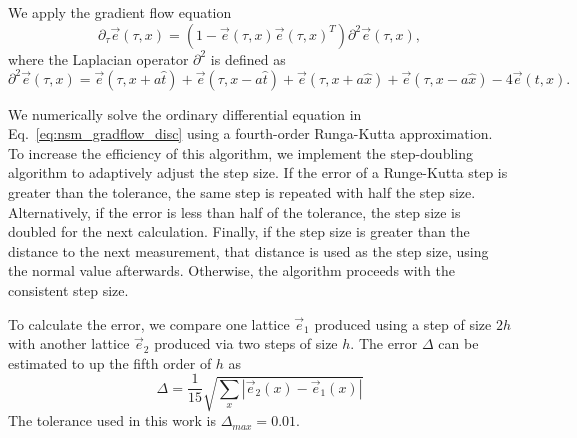 \documentclass[a4paper,11pt]{article}
\newcommand{\e}{\vec e}
\begin{document}
We apply the gradient flow equation
\begin{equation}
    \label{eq:nsm_gradflow_disc}
    \partial_\tau \e (\tau, x) = \left( 1 - \e(\tau,x) \e(\tau,x)^T\right) \partial^2 \e(\tau,x),
\end{equation}
where the Laplacian operator $\partial^2$ is defined as
\begin{equation*}
    \partial^2 \e(\tau,x) = \e(\tau, x+a \hat{t}) + \e(\tau,x-a\hat t) + \e(\tau, x+a \hat{x}) + \e(\tau,x-a\hat x) - 4 \e(t,x).
\end{equation*}

We numerically solve the ordinary differential equation in Eq.~\ref{eq:nsm_gradflow_disc} using a fourth-order Runga-Kutta approximation. To increase the efficiency of this algorithm, we implement the step-doubling algorithm to adaptively adjust the step size. If the error of a Runge-Kutta step is greater than the tolerance, the same step is repeated with half the step size. Alternatively, if the error is less than half of the tolerance, the step size is doubled for the next calculation. Finally, if the step size is greater than the distance to the next measurement, that distance is used as the step size, using the normal value afterwards. Otherwise, the algorithm proceeds with the consistent step size. 

To calculate the error, we compare one lattice $\e_1$ produced using a step of size $2h$ with another lattice $\e_2$ produced via two steps of size $h$. The error $\Delta$ can be estimated to up the fifth order of $h$ as \cite{vetterling1992}
\begin{equation}
\Delta = \frac{1}{15}\sqrt{\sum_x \left| \e_2(x) - \e_1(x) \right|}
\end{equation}
The tolerance used in this work is $\Delta_{max}=0.01$.
\end{document}
